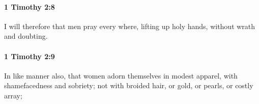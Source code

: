 		\paragraph{1 Timothy 2:8} %
			\label{1TIMOTHY-2-8}

			I will therefore that men pray every where, lifting up holy hands, without wrath and doubting.

			\begin{framed}
			\scriptsize
				\begin{compactdesc}
					\item[SBLG] 
				\end{compactdesc}
			\end{framed}

		\paragraph{1 Timothy 2:9} %
			\label{1TIMOTHY-2-9}

			In like manner also, that women adorn themselves in modest apparel, with shamefacedness and sobriety; not with broided hair, or gold, or pearls, or costly array;


